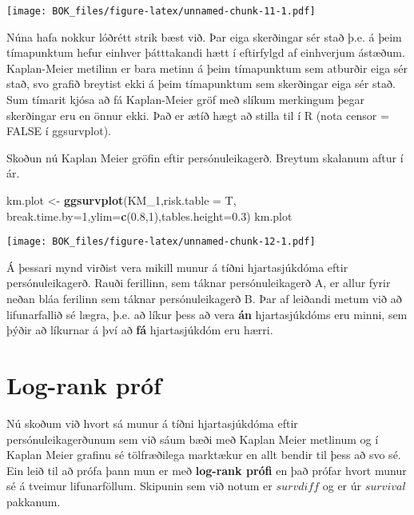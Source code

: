 \documentclass[
]{book}
\newenvironment{Shaded}{\begin{snugshade}}{\end{snugshade}}
\newcommand{\DataTypeTok}[1]{\textcolor[rgb]{0.13,0.29,0.53}{#1}}
\newcommand{\DecValTok}[1]{\textcolor[rgb]{0.00,0.00,0.81}{#1}}
\newcommand{\FloatTok}[1]{\textcolor[rgb]{0.00,0.00,0.81}{#1}}
\newcommand{\KeywordTok}[1]{\textcolor[rgb]{0.13,0.29,0.53}{\textbf{#1}}}
\newcommand{\NormalTok}[1]{#1}
\newcommand{\StringTok}[1]{\textcolor[rgb]{0.31,0.60,0.02}{#1}}
\begin{document}
\texttt{[image: BOK\_files/figure-latex/unnamed-chunk-11-1.pdf]}

Núna hafa nokkur lóðrétt strik bæst við. Þar eiga skerðingar sér stað þ.e. á þeim tímapunktum hefur einhver þátttakandi hætt í eftirfylgd af einhverjum ástæðum. Kaplan-Meier metilinn er bara metinn á þeim tímapunktum sem atburðir eiga sér stað, svo grafið breytist ekki á þeim tímapunktum sem skerðingar eiga sér stað. Sum tímarit kjósa að fá Kaplan-Meier gröf með slíkum merkingum þegar skerðingar eru en önnur ekki. Það er ætíð hægt að stilla til í R (nota censor = FALSE í ggsurvplot).

Skoðun nú Kaplan Meier gröfin eftir persónuleikagerð. Breytum skalanum aftur í ár.

\begin{Shaded}
\begin{Highlighting}[]
\NormalTok{km.plot <-}\StringTok{ }\KeywordTok{ggsurvplot}\NormalTok{(KM_}\DecValTok{1}\NormalTok{,}\DataTypeTok{risk.table =}\NormalTok{ T,}
                        \DataTypeTok{break.time.by=}\DecValTok{1}\NormalTok{,}\DataTypeTok{ylim=}\KeywordTok{c}\NormalTok{(}\FloatTok{0.8}\NormalTok{,}\DecValTok{1}\NormalTok{),}\DataTypeTok{tables.height=}\FloatTok{0.3}\NormalTok{) }
\NormalTok{km.plot}
\end{Highlighting}
\end{Shaded}

\texttt{[image: BOK\_files/figure-latex/unnamed-chunk-12-1.pdf]}

Á þessari mynd virðist vera mikill munur á tíðni hjartasjúkdóma eftir persónuleikagerð. Rauði ferillinn, sem táknar persónuleikagerð A, er allur fyrir neðan bláa ferilinn sem táknar persónuleikagerð B. Þar af leiðandi metum við að lifunarfallið sé lægra, þ.e. að líkur þess að vera \textbf{án} hjartasjúkdóms eru minni, sem þýðir að líkurnar á því að \textbf{fá} hjartasjúkdóm eru hærri.

\hypertarget{log-rank-pruxf3f}{%
\section{Log-rank próf}\label{log-rank-pruxf3f}}

Nú skoðum við hvort sá munur á tíðni hjartasjúkdóma eftir persónuleikagerðunum sem við sáum bæði með Kaplan Meier metlinum og í Kaplan Meier grafinu sé tölfræðilega marktækur en allt bendir til þess að svo sé. Ein leið til að prófa þann mun er með \textbf{log-rank prófi} en það prófar hvort munur sé á tveimur lifunarföllum. Skipunin sem við notum er \(survdiff\) og er úr \(survival\) pakkanum.
\end{document}

